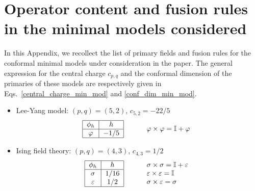 \documentclass[a4paper,11pt]{article}
\begin{document}
\section{Operator content and fusion rules in the minimal models considered}\label{app_min_mod}

In this Appendix, we recollect the list of primary fields and fusion rules for the 
conformal minimal models under consideration in the paper. The general expression 
for the central charge $c_{p, q}$ and the conformal dimension of the primaries of 
these models are respectively given in Eqs.~\eqref{central_charge_min_mod} and \eqref{conf_dim_min_mod}.

\begin{itemize}
 \item Lee-Yang model: $(p, q)=(5,2)$, $c_{5, 2}=-22/5$
       \begin{equation}
 \begin{tabular}{cc}
 \begin{tabular}{|c|c|}
  \hline
  $\phi_h$        & $h$ \\
  \hline
  $\varphi$  & $-1/5$    \\
  \hline
 \end{tabular}
 &
 \hskip 0.5cm 
 \begin{tabular}{l}
  $\varphi \times \varphi = \mathbb{I} +\varphi$ \\
 \end{tabular}
 \end{tabular}
\end{equation} 
\item Ising field theory: $(p, q)=(4,3)$, $c_{4, 3}=1/2$
\begin{equation}
\begin{tabular}{cc}
 \begin{tabular}{|c|c|}
  \hline
  $\phi_h$        & $h$ \\
  \hline
  $\sigma$  & $1/16$    \\
  $\varepsilon$ & $1/2$ \\
  \hline
 \end{tabular}
 &
 \hskip 0.5cm 
 \begin{tabular}{l}
  $\sigma \times \sigma = \mathbb{I} +\varepsilon$ \\
  $\varepsilon \times \varepsilon = \mathbb{I}$ \\
  $\sigma \times \varepsilon = \sigma$\\
 \end{tabular}
\end{tabular}
\end{equation}


\end{itemize}
\end{document}
